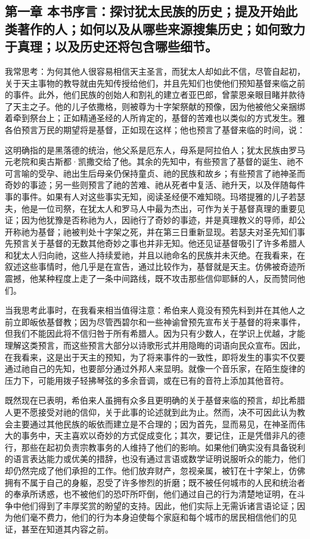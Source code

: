 \subsection{第一章 本书序言：探讨犹太民族的历史；提及开始此类著作的人；如何以及从哪些来源搜集历史；如何致力于真理；以及历史还将包含哪些细节。}

我常思考：为何其他人很容易相信天主圣言，而犹太人却如此不信，尽管自起初，关于天主事物的教导就由先知传授给他们，并且先知们也使他们预知基督来临之前的事件。此外，他们民族的创始人和割礼的建立者亚巴郎，曾蒙恩亲眼目睹并款待了天主之子。他的儿子依撒格，则被尊为十字架祭献的预像，因为他被他父亲捆绑着牵到祭台上；正如精通圣经的人所肯定的，基督的苦难也以类似的方式发生。雅各伯预言万民的期望将是基督，正如现在这样；他也预言了基督来临的时间，说：\par

这明确指的是黑落德的统治，他父系是厄东人，母系是阿拉伯人；犹太民族由罗马元老院和奥古斯都·凯撒交给了他。其余的先知中，有些预言了基督的诞生、祂不可言喻的受孕、祂出生后母亲仍保持童贞、祂的民族和故乡；有些预言了祂神圣而奇妙的事迹；另一些则预言了祂的苦难、祂从死者中复活、祂升天，以及伴随每件事的事件。如果有人对这些事实无知，阅读圣经便不难知晓。玛塔提雅的儿子若瑟夫，他是一位司祭，在犹太人和罗马人中最为杰出，可作为关于基督真理的重要见证；因为他犹豫是否称祂为人，因祂行了奇妙的事迹，并是真理教义的导师，却公开称祂为基督；祂被判处十字架之死，并在第三日重新显现。若瑟夫对圣先知们事先预言关于基督的无数其他奇妙之事也并非无知。他还见证基督吸引了许多希腊人和犹太人归向祂，这些人持续爱祂，并且以祂命名的民族并未灭绝。在我看来，在叙述这些事情时，他几乎是在宣告，通过比较作为，基督就是天主。仿佛被奇迹所震撼，他某种程度上走了一条中间路线，既不攻击那些信仰耶稣的人，反而赞同他们。\par

当我思考此事时，在我看来相当值得注意：希伯来人竟没有预先料到并在其他人之前立即皈依基督教；因为尽管西碧尔和一些神谕曾预先宣布关于基督的将来事件，但我们不能因此将不信归咎于所有希腊人。因为只有少数人，在学识上优越，才能理解这类预言，而这些预言大部分以诗歌形式并用隐晦的词语向民众宣布。因此，在我看来，这是出于天主的预知，为了将来事件的一致性，即将发生的事实不仅要通过祂自己的先知，也要部分通过外邦人来显明。就像一个音乐家，在陌生旋律的压力下，可能用拨子轻拂琴弦的多余音调，或在已有的音符上添加其他音符。\par

既然现在已表明，希伯来人虽拥有众多且更明确的关于基督来临的预言，却比希腊人更不愿接受对祂的信仰，关于此事的论述就到此为止。然而，决不可因此认为教会主要通过其他民族的皈依而建立是不合理的；因为首先，显而易见，在神圣而伟大的事务中，天主喜欢以奇妙的方式促成变化；其次，要记住，正是凭借非凡的德行，那些在起初负责宗教事务的人维持了他们的影响。如果他们确实没有具备锐利的语言表达能力或优美的措辞，也没有通过言语或数学证明说服听众的能力，他们却仍然完成了他们承担的工作。他们放弃财产，忽视亲属，被钉在十字架上，仿佛拥有不属于自己的身躯，忍受了许多惨烈的折磨；既不被任何城市的人民和统治者的奉承所诱惑，也不被他们的恐吓所吓倒，他们通过自己的行为清楚地证明，在斗争中他们得到了丰厚奖赏的盼望的支持。因此，他们实际上无需诉诸言语论证；因为他们毫不费力，他们的行为本身迫使每个家庭和每个城市的居民相信他们的见证，甚至在知道其内容之前。\par

